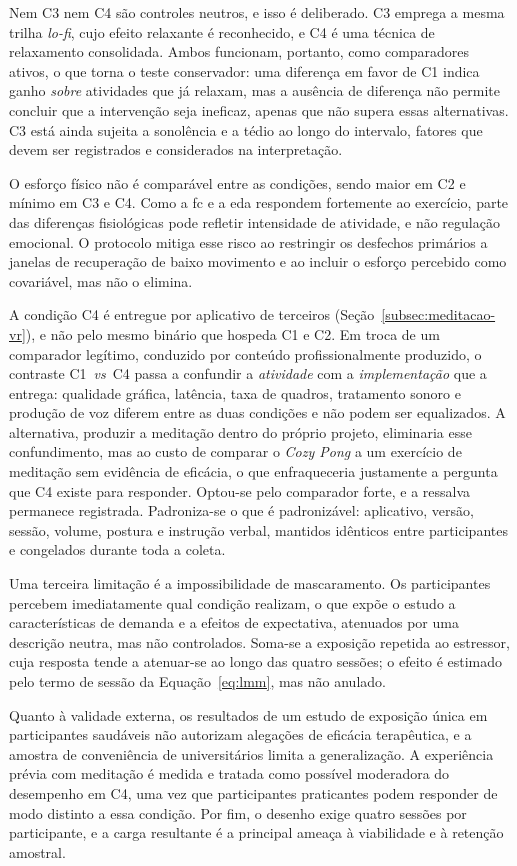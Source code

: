 Nem C3 nem C4 são controles neutros, e isso é deliberado. C3 emprega a mesma trilha \textit{lo-fi}, cujo efeito relaxante é reconhecido, e C4 é uma técnica de relaxamento consolidada. Ambos funcionam, portanto, como comparadores ativos, o que torna o teste conservador: uma diferença em favor de C1 indica ganho \emph{sobre} atividades que já relaxam, mas a ausência de diferença não permite concluir que a intervenção seja ineficaz, apenas que não supera essas alternativas. C3 está ainda sujeita a sonolência e a tédio ao longo do intervalo, fatores que devem ser registrados e considerados na interpretação.

O esforço físico não é comparável entre as condições, sendo maior em C2 e mínimo em C3 e C4. Como a \gls{fc} e a \gls{eda} respondem fortemente ao exercício, parte das diferenças fisiológicas pode refletir intensidade de atividade, e não regulação emocional. O protocolo mitiga esse risco ao restringir os desfechos primários a janelas de recuperação de baixo movimento e ao incluir o esforço percebido como covariável, mas não o elimina.

A condição C4 é entregue por aplicativo de terceiros (Seção~\ref{subsec:meditacao-vr}), e não pelo mesmo binário que hospeda C1 e C2. Em troca de um comparador legítimo, conduzido por conteúdo profissionalmente produzido, o contraste C1~\textit{vs}~C4 passa a confundir a \emph{atividade} com a \emph{implementação} que a entrega: qualidade gráfica, latência, taxa de quadros, tratamento sonoro e produção de voz diferem entre as duas condições e não podem ser equalizados. A alternativa, produzir a meditação dentro do próprio projeto, eliminaria esse confundimento, mas ao custo de comparar o \textit{Cozy Pong} a um exercício de meditação sem evidência de eficácia, o que enfraqueceria justamente a pergunta que C4 existe para responder. Optou-se pelo comparador forte, e a ressalva permanece registrada. Padroniza-se o que é padronizável: aplicativo, versão, sessão, volume, postura e instrução verbal, mantidos idênticos entre participantes e congelados durante toda a coleta.

Uma terceira limitação é a impossibilidade de mascaramento. Os participantes percebem imediatamente qual condição realizam, o que expõe o estudo a características de demanda e a efeitos de expectativa, atenuados por uma descrição neutra, mas não controlados. Soma-se a exposição repetida ao estressor, cuja resposta tende a atenuar-se ao longo das quatro sessões; o efeito é estimado pelo termo de sessão da Equação~\ref{eq:lmm}, mas não anulado.

Quanto à validade externa, os resultados de um estudo de exposição única em participantes saudáveis não autorizam alegações de eficácia terapêutica, e a amostra de conveniência de universitários limita a generalização. A experiência prévia com meditação é medida e tratada como possível moderadora do desempenho em C4, uma vez que participantes praticantes podem responder de modo distinto a essa condição. Por fim, o desenho exige quatro sessões por participante, e a carga resultante é a principal ameaça à viabilidade e à retenção amostral.
